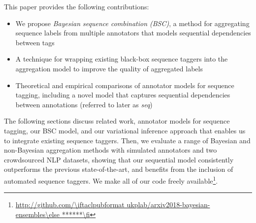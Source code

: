 %

This paper provides the following contributions:
\begin{itemize}
 \item We propose \emph{Bayesian sequence combination (BSC)}, 
 a method for aggregating sequence labels from multiple annotators 
 that models sequential dependencies between tags 
 \item A technique for wrapping existing black-box sequence taggers into the aggregation model to improve 
 the quality of aggregated labels
 \item Theoretical and empirical comparisons of annotator models 
  for sequence tagging, including a novel model that captures sequential dependencies between annotations (referred to later as \emph{seq})
\end{itemize}
The following sections discuss related work, 
annotator models for sequence tagging,
our BSC model, and our variational inference approach
 that enables us to integrate existing sequence taggers. 
Then, we evaluate a range of Bayesian and non-Bayesian aggregation methods
with simulated annotators and two crowdsourced NLP datasets,
showing that our sequential model consistently outperforms the previous state-of-the-art,
and benefits from the inclusion of automated sequence taggers.
We make 
all of our code freely available\footnote{\url{http://github.com/\iftaclpubformat ukplab/arxiv2018-bayesian-ensembles\else ******\fi}}.

